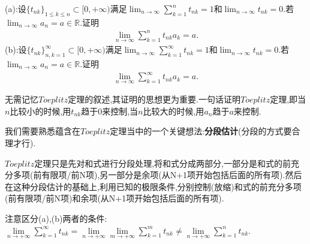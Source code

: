 \documentclass[lang=cn,newtx,10pt,scheme=chinese]{elegantbook}
\begin{document}
\begin{theorem}[Toeplitz定理]\label{theorem:Toeplitz定理}
   (a):设\(\{t_{nk}\}_{1\leqslant k\leqslant n} \subset [0, +\infty)\)满足\(\lim_{n \to \infty} \sum\limits_{k = 1}^{n} t_{nk} = 1\)和\(\lim_{n \to \infty} t_{nk} = 0\).若\(\lim_{n \to \infty} a_n = a \in \mathbb{R}\).证明
   \begin{align}\label{equation:2.5}
      \lim_{n \to \infty} \sum\limits_{k = 1}^{n} t_{nk}a_k = a.
   \end{align}
(b):设\(\{t_{nk}\}_{n,k = 1}^{\infty} \subset [0, +\infty)\)满足\(\lim_{n \to \infty} \sum\limits_{k = 1}^{\infty} t_{nk} = 1\)和\(\lim_{n \to \infty} t_{nk} = 0\).若\(\lim_{n \to \infty} a_n = a \in \mathbb{R}\).证明
\begin{align}\label{equation:2.6}
   \lim_{n \to \infty} \sum\limits_{k = 1}^{\infty} t_{nk}a_k = a.
\end{align}
\end{theorem}
\begin{note}
   无需记忆$Toeplitz$定理的叙述,其证明的思想更为重要.一句话证明$Toeplitz$定理,即当\(n\)比较小的时候,用\(t_{nk}\)趋于\(0\)来控制,当\(n\)比较大的时候,用\(a_n\)趋于\(a\)来控制.
   
   我们需要熟悉蕴含在$Toeplitz$定理当中的一个关键想法:\textbf{分段估计}(分段的方式要合理才行).
   
   $Toeplitz$定理只是先对和式进行分段处理,将和式分成两部分,一部分是和式的前充分多项(前有限项/前N项),另一部分是余项(从N+1项开始包括后面的所有项).然后在这种分段估计的基础上,利用已知的极限条件,分别控制(放缩)和式的前充分多项(前有限项/前N项)和余项(从N+1项开始包括后面的所有项).
\end{note}
\begin{remark}
   注意区分(a),(b)两者的条件:$\underset{n\rightarrow +\infty}{\lim}\sum\limits_{k=1}^{\infty}{t_{nk}}=\underset{n\rightarrow +\infty}{\lim}\underset{m\rightarrow +\infty}{\lim}\sum\limits_{k=1}^m{t_{nk}}\ne \underset{n\rightarrow +\infty}{\lim}\sum\limits_{k=1}^n{t_{nk}}$.
\end{remark}
\end{document}
